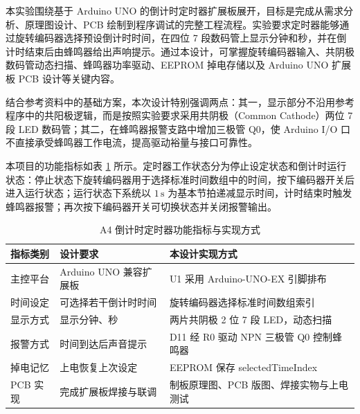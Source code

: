 \documentclass[UTF8,a4paper,12pt]{ctexart}
\newcounter{makepart}
\begin{document}
\makecoveri


本实验围绕基于 Arduino UNO 的倒计时定时器扩展板展开，目标是完成从需求分析、原理图设计、PCB 绘制到程序调试的完整工程流程。实验要求定时器能够通过旋转编码器选择预设倒计时时间，在四位 7 段数码管上显示分钟和秒，并在倒计时结束后由蜂鸣器给出声响提示。通过本设计，可掌握旋转编码器输入、共阴极数码管动态扫描、蜂鸣器功率驱动、EEPROM 掉电存储以及 Arduino UNO 扩展板 PCB 设计等关键内容。

结合参考资料中的基础方案，本次设计特别强调两点：其一，显示部分不沿用参考程序中的共阳极逻辑，而是按照实验要求采用共阴极（Common Cathode）两位 7 段 LED 数码管；其二，在蜂鸣器报警支路中增加三极管 Q0，使 Arduino I/O 口不直接承受蜂鸣器工作电流，提高驱动裕量与接口可靠性。


本项目的功能指标如表 \ref{tab:requirements} 所示。定时器工作状态分为停止设定状态和倒计时运行状态：停止状态下旋转编码器用于选择标准时间数组中的时间，按下编码器开关后进入运行状态；运行状态下系统以 $1\,\mathrm{s}$ 为基本节拍递减显示时间，计时结束时触发蜂鸣器报警；再次按下编码器开关可切换状态并关闭报警输出。

\begin{table}[H]
  \centering
  \caption{A4 倒计时定时器功能指标与实现方式}
  \label{tab:requirements}
  \begin{tabular}{>{\raggedright\arraybackslash}p{}
                  >{\raggedright\arraybackslash}p{}
                  >{\raggedright\arraybackslash}p{}}
    \toprule
    指标类别 & 设计要求 & 本设计实现方式 \\
    \midrule
    主控平台 & Arduino UNO 兼容扩展板 & U1 采用 Arduino-UNO-EX 引脚排布 \\
    时间设定 & 可选择若干倒计时时间 & 旋转编码器选择标准时间数组索引 \\
    显示方式 & 显示分钟、秒 & 两片共阴极 2 位 7 段 LED，动态扫描 \\
    报警方式 & 时间到达后声音提示 & D11 经 R0 驱动 NPN 三极管 Q0 控制蜂鸣器 \\
    掉电记忆 & 上电恢复上次设定 & EEPROM 保存 selectedTimeIndex \\
    PCB 实现 & 完成扩展板焊接与联调 & 制板原理图、PCB 版图、焊接实物与上电测试 \\
    \bottomrule
  \end{tabular}
\end{table}

\end{document}
